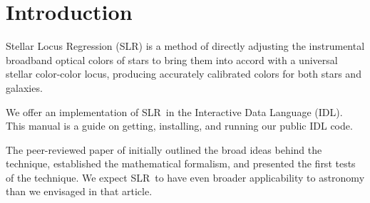 \documentclass{report}
\newcommand{\slr}{SLR}
\begin{document}





\tableofcontents
{}
\setcounter{page}{1}

% 

\chapter{Introduction}

Stellar Locus Regression (\slr) is a method of directly adjusting the
instrumental broadband optical colors of stars to bring them into
accord with a universal stellar color-color locus, producing
accurately calibrated colors for both stars and galaxies.  

We offer an implementation of \slr\ in the Interactive Data Language
(IDL).  This manual is a guide on getting, installing, and running our
public IDL code.

The peer-reviewed paper of \citet{bib:slr} initially outlined the
broad ideas behind the technique, established the mathematical
formalism, and presented the first tests of the technique.  We expect
\slr\ to have even broader applicability to astronomy than we
envisaged in that article.
\end{document}
